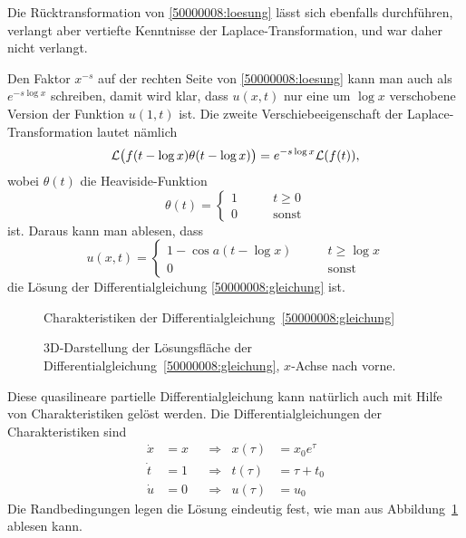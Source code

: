 \begin{diskussion}
Die Rücktransformation von \eqref{50000008:loesung} lässt sich
ebenfalls durchführen, verlangt aber vertiefte Kenntnisse der
Laplace-Transformation, und war daher nicht verlangt.

Den Faktor $x^{-s}$ auf der rechten Seite von \eqref{50000008:loesung}
kann man auch als $e^{-s\log x}$
schreiben, damit wird klar, dass $u(x,t)$ nur eine um $\log x$ verschobene
Version der Funktion $u(1,t)$ ist. 
Die zweite Verschiebeeigenschaft der Laplace-Transformation lautet nämlich
\[
{\cal L}\bigl(f(t-\log x)\theta(t-\log x)\bigr)
=
e^{-s\log x}{\cal L}(f(t)),
\]
wobei $\theta(t)$ die Heaviside-Funktion
\[
\theta(t)=\begin{cases}1\qquad&t \ge 0\\ 0&\text{sonst}\end{cases}
\]
ist. Daraus kann man ablesen, dass
\begin{equation}
u(x,t)=\begin{cases}
1-\cos a(t-\log x)\qquad
&t \ge \log x\\
0
&\text{sonst}
\end{cases}
\label{50000008:ruecktransformiert}
\end{equation}
die Lösung der Differentialgleichung \eqref{50000008:gleichung} ist.
\begin{figure}
\centering
{}
\caption{Charakteristiken der Differentialgleichung~\eqref{50000008:gleichung}
\label{50000008:charakteristiken}}
\end{figure}
\begin{figure}
\centering
{}
\caption{3D-Darstellung der Lösungsfläche der
Differentialgleichung~\eqref{50000008:gleichung}, $x$-Achse nach vorne.
\label{50000008:loesung}}
\end{figure}


Diese quasilineare partielle Differentialgleichung kann natürlich auch
mit Hilfe von Charakteristiken gelöst werden.
Die Differentialgleichungen der Charakteristiken sind
\begin{equation}
\begin{aligned}
\dot x&=x&
&\Rightarrow&
x(\tau)&=x_0e^\tau
\\
\dot t&=1&
&\Rightarrow&
t(\tau)&=\tau + t_0
\\
\dot u&=0&
&\Rightarrow&
u(\tau)&=u_0
\end{aligned}
\label{50000008:chardgl}
\end{equation}
Die Randbedingungen legen die Lösung eindeutig fest, wie man aus
Abbildung~\ref{50000008:charakteristiken} ablesen kann.


\end{diskussion}
